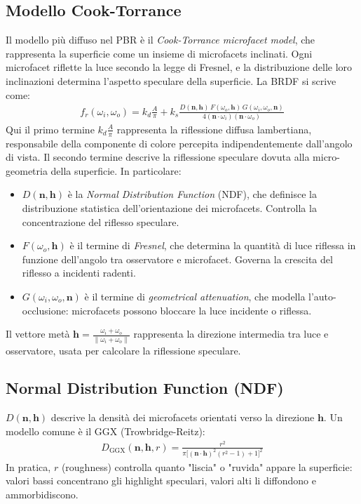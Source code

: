 \documentclass[12pt,a4paper,openright,twoside]{book}
\begin{document}
\subsection*{Modello Cook-Torrance}
Il modello più diffuso nel PBR è il \emph{Cook-Torrance microfacet model}, che rappresenta la superficie come un insieme
di microfacets inclinati. Ogni microfacet riflette la luce secondo la legge di Fresnel, e la distribuzione delle
loro inclinazioni determina l'aspetto speculare della superficie.
La BRDF si scrive come:
\begin{align*}
f_r(\omega_i,\omega_o) = k_d \frac{A}{\pi} +
k_s \frac{D(\mathbf{n},\mathbf{h})\,F(\omega_o,\mathbf{h})\,G(\omega_i,\omega_o,\mathbf{n})}
{4(\mathbf{n}\cdot\omega_i)(\mathbf{n}\cdot\omega_o)}
\end{align*}
\noindent
Qui il primo termine $k_d \frac{A}{\pi}$ rappresenta la riflessione diffusa lambertiana, responsabile della componente di
colore percepita indipendentemente dall'angolo di vista.
Il secondo termine descrive la riflessione speculare dovuta alla micro-geometria della superficie. In particolare:
\begin{itemize}
    \item $D(\mathbf{n},\mathbf{h})$ è la \emph{Normal Distribution Function} (NDF), che definisce la distribuzione statistica
    dell'orientazione dei microfacets. Controlla la concentrazione del riflesso speculare.
    \item $F(\omega_o,\mathbf{h})$ è il termine di \emph{Fresnel}, che determina la quantità di luce riflessa in funzione
    dell'angolo tra osservatore e microfacet. Governa la crescita del riflesso a incidenti radenti.
    \item $G(\omega_i,\omega_o,\mathbf{n})$ è il termine di \emph{geometrical attenuation}, che modella l'auto-occlusione:
    microfacets possono bloccare la luce incidente o riflessa.
\end{itemize}
Il vettore metà $\mathbf{h} = \frac{\omega_i+\omega_o}{\|\omega_i+\omega_o\|}$ rappresenta la direzione intermedia
tra luce e osservatore, usata per calcolare la riflessione speculare.

\subsection*{Normal Distribution Function (NDF)}
$D(\mathbf{n},\mathbf{h})$ descrive la densità dei microfacets orientati verso la direzione $\mathbf{h}$.  
Un modello comune è il GGX (Trowbridge-Reitz):
\begin{align*}
D_{\text{GGX}}(\mathbf{n},\mathbf{h},r) =
\frac{r^2}
{\pi \big[(\mathbf{n}\cdot\mathbf{h})^2(r^2-1)+1\big]^2}
\end{align*}
\noindent
In pratica, $r$ (roughness) controlla quanto "liscia" o "ruvida" appare la superficie: valori bassi concentrano gli
highlight speculari, valori alti li diffondono e ammorbidiscono.
\end{document}
